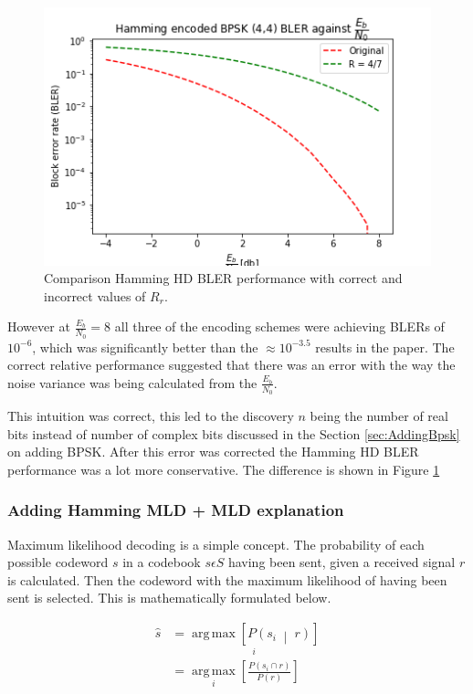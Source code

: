 \documentclass[12pt,onecolumn,letterpaper]{article}
\newcommand\genfigsize{0.5}
\DeclareMathOperator*{\argmax}{arg\,max}
\begin{document}
\begin{figure}
   \centering
   \includegraphics[width=\genfigsize\linewidth]{figures/hamming_correct_Rr_comparison.png}
   \caption{Comparison Hamming HD BLER performance with correct and incorrect values of $R_r$.}
   \label{fig:HammingCorrectRrComp}
\end{figure}

However at $\frac{E_b}{N_0} = 8$ all three of the encoding schemes were achieving BLERs of $10^{-6}$, which was significantly better than the $\approx10^{-3.5}$ results in the paper. The correct relative performance suggested that there was an error with the way the noise variance was being calculated from the $\frac{E_b}{N_0}$.

This intuition was correct, this led to the discovery $n$ being the number of real bits instead of number of complex bits discussed in the Section \ref{sec:AddingBpsk} on adding BPSK. After this error was corrected the Hamming HD BLER performance was a lot more conservative. The difference is shown in Figure \ref{fig:HammingCorrectRrComp}

\subsubsection{Adding Hamming MLD + MLD explanation}

Maximum likelihood decoding is a simple concept. The probability of each possible codeword $s$ in a codebook $s\epsilon S$ having been sent, given a received signal $r$ is calculated. Then the codeword with the maximum likelihood of having been sent is selected. This is mathematically formulated below.

\begin{align}
   \hat{s} &= \underset{i}{\argmax\left[P\left(s_i\;\middle|\;r\right)\right]} \\
    &= \underset{i}{\argmax}\left[\frac{P\left(s_i\cap r\right)}{P\left(r\right)}\right]
\end{align}
\end{document}
